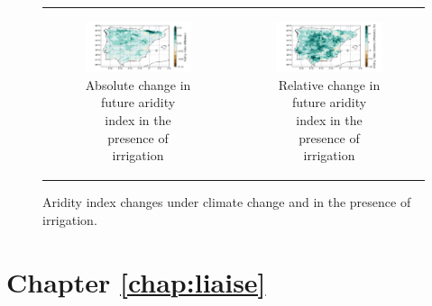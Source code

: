 \begin{figure}[htbp]
\begin{tabular}{cc}
        \begin{subfigure}[b]{0.5\textwidth}
            \caption{Absolute change in future aridity index in the presence of irrigation}
            \includegraphics[width=\textwidth]{images/chap4/future/diffmap_aridity_index_futirr.png}
        \end{subfigure} &
        \begin{subfigure}[b]{0.5\textwidth}
            \caption{Relative change in future aridity index in the presence of irrigation}
            \includegraphics[width=\textwidth]{images/chap4/future/reldiffmap_aridity_index_futirr.png}
        \end{subfigure} \\
    \end{tabular}
    \caption{Aridity index changes under climate change and in the presence of irrigation.}
    \label{fig:diffmaps_aridity}
\end{figure}

\clearpage

\section*{Chapter \ref{chap:liaise}}

